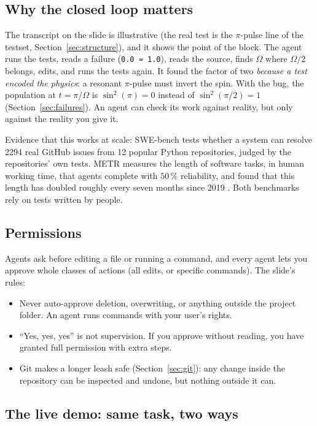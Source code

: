 \subsection{Why the closed loop matters}

The transcript on the slide is illustrative (the real test is the $\pi$-pulse line of the
 testset, Section~\ref{sec:structure}), and it shows the point of the block. The agent runs the tests, reads a failure (\lstinline|0.0 ≈ 1.0|), reads the
source, finds $\Omega$ where $\Omega/2$ belongs, edits, and runs the tests again. It
found the factor of two \emph{because a test encoded the physics}: a resonant
$\pi$-pulse must invert the spin. With the bug, the population at $t = \pi/\Omega$ is
$\sin^2(\pi) = 0$ instead of $\sin^2(\pi/2) = 1$ (Section~\ref{sec:failures}). An agent
can check its work against reality, but only against the reality you give it.

Evidence that this works at scale: SWE-bench  tests whether a system can
resolve 2294 real GitHub issues from 12 popular Python repositories, judged by the repositories'
own tests. METR measures the length of software tasks, in human working time, that
agents complete with $50\,\%$ reliability, and found that this length has doubled
roughly every seven months since 2019 . Both benchmarks rely on
tests written by people.

\subsection{Permissions}

Agents ask before editing a file or running a command, and every agent lets you approve
whole classes of actions (all edits, or specific commands). The slide's rules:
\begin{itemize}
  \item Never auto-approve deletion, overwriting, or anything outside the project
        folder. An agent runs commands with your user's rights.
  \item ``Yes, yes, yes'' is not supervision. If you approve without reading, you have
        granted full permission with extra steps.
  \item Git makes a longer leash safe (Section~\ref{sec:git}): any change inside the
        repository can be inspected and undone, but nothing outside it can.
\end{itemize}

\subsection{The live demo: same task, two ways}


